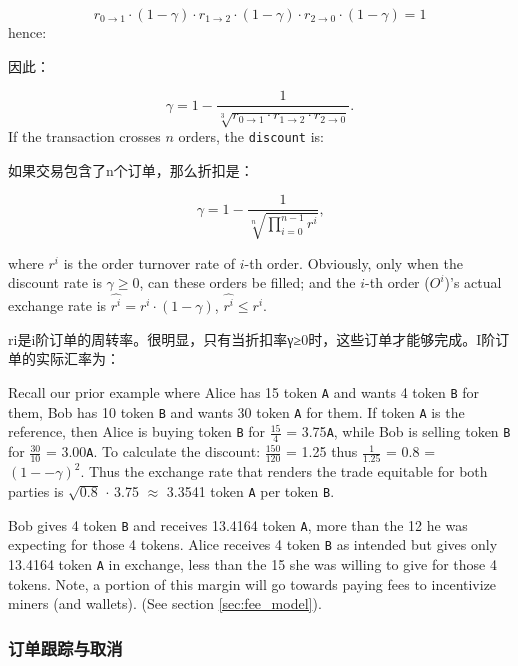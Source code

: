 \documentclass[UTF8,nofonts]{ctexart}
\begin{document}
\begin{multicols}{2}
\begin{equation}
r_{0\rightarrow 1} \cdot (1-\gamma)\cdot r_{1\rightarrow 2} \cdot (1-\gamma) \cdot r_{2 \rightarrow 0} \cdot (1-\gamma) = 1
\end{equation}
hence: 

因此：



\begin{equation}
\gamma = 1- \frac{1}{\sqrt[3]{r_{0\rightarrow 1} \cdot r_{1\rightarrow 2} \cdot r_{2\rightarrow 0}}}\text{.}
\end{equation}
If the transaction crosses $n$ orders, the \texttt{discount} is: 

如果交易包含了n个订单，那么折扣是：


\begin{equation}
\gamma = 1- \frac{1}{\sqrt[n]{\prod_{i=0}^{n-1} r^i}} \text{,}
\end{equation}

where $r^i$ is the order turnover rate of $i$-th order. Obviously, only when the discount rate is $\gamma \ge 0$, can these orders be filled; and the $i$-th order ($O^i$)'s actual exchange rate is $\hat{r^i} = r^i \cdot (1-\gamma)$, $\hat{r^i}\le r^i$.

ri是i阶订单的周转率。很明显，只有当折扣率γ≥0时，这些订单才能够完成。I阶订单的实际汇率为：


Recall our prior example where Alice has 15 token \verb|A| and wants 4 token \verb|B| for them, Bob has 10 token \verb|B| and wants 30 token \verb|A| for them. If token \verb|A| is the reference, then Alice is buying token \verb|B| for $\frac{15}{4}$ = 3.75\verb|A|, while Bob is selling token \verb|B| for $\frac{30}{10}$ = 3.00\verb|A|. To calculate the discount: $\frac{150}{120}$ = 1.25 thus $\frac{1}{1.25}$ = 0.8 = $(1 −- \gamma)^2$. Thus the exchange rate that renders the trade equitable for both parties is $\sqrt{0.8}$ $\cdot$ 3.75 $\approx$ 3.3541 token \verb|A| per token \verb|B|.

Bob gives 4 token \verb|B| and receives 13.4164 token \verb|A|, more than the 12 he was expecting for those 4 tokens. Alice receives 4 token \verb|B| as intended but gives only 13.4164 token \verb|A| in exchange, less than the 15 she was willing to give for those 4 tokens.
Note, a portion of this margin will go towards paying fees to incentivize miners (and wallets). (See section \ref{sec:fee_model}).


\subsubsection{订单跟踪与取消}


\end{multicols}
\end{document}

